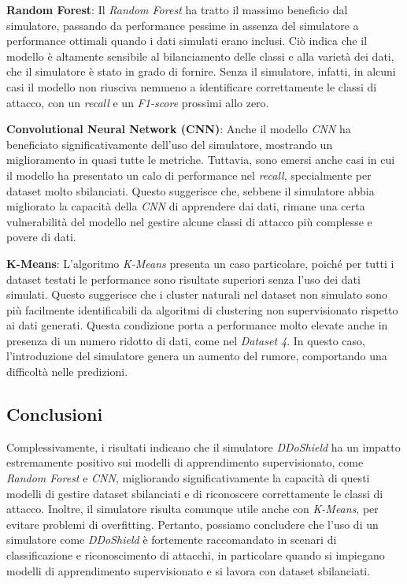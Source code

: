 \textbf{Random Forest}: Il \textit{Random Forest} ha tratto il massimo beneficio dal simulatore, passando da performance pessime in assenza del simulatore a performance ottimali quando i dati simulati erano inclusi. Ciò indica che il modello è altamente sensibile al bilanciamento delle classi e alla varietà dei dati, che il simulatore è stato in grado di fornire. Senza il simulatore, infatti, in alcuni casi il modello non riusciva nemmeno a identificare correttamente le classi di attacco, con un \textit{recall} e un \textit{F1-score} prossimi allo zero.

\textbf{Convolutional Neural Network (CNN)}: Anche il modello \textit{CNN} ha beneficiato significativamente dell'uso del simulatore, mostrando un miglioramento in quasi tutte le metriche. Tuttavia, sono emersi anche casi in cui il modello ha presentato un calo di performance nel \textit{recall}, specialmente per dataset molto sbilanciati. Questo suggerisce che, sebbene il simulatore abbia migliorato la capacità della \textit{CNN} di apprendere dai dati, rimane una certa vulnerabilità del modello nel gestire alcune classi di attacco più complesse e povere di dati.

\textbf{K-Means}: L'algoritmo \textit{K-Means} presenta un caso particolare, poiché per tutti i dataset testati le performance sono risultate superiori senza l'uso dei dati simulati. Questo suggerisce che i cluster naturali nel dataset non simulato sono più facilmente identificabili da algoritmi di clustering non supervisionato rispetto ai dati generati. Questa condizione porta a performance molto elevate anche in presenza di un numero ridotto di dati, come nel \textit{Dataset 4}. In questo caso, l'introduzione del simulatore genera un aumento del rumore, comportando una difficoltà nelle predizioni.

\subsection{Conclusioni}
Complessivamente, i risultati indicano che il simulatore \textit{DDoShield} ha un impatto estremamente positivo sui modelli di apprendimento supervisionato, come \textit{Random Forest} e \textit{CNN}, migliorando significativamente la capacità di questi modelli di gestire dataset sbilanciati e di riconoscere correttamente le classi di attacco. Inoltre, il simulatore risulta comunque utile anche con \textit{K-Means}, per evitare problemi di overfitting.
Pertanto, possiamo concludere che l'uso di un simulatore come \textit{DDoShield} è fortemente raccomandato in scenari di classificazione e riconoscimento di attacchi, in particolare quando si impiegano modelli di apprendimento supervisionato e si lavora con dataset sbilanciati. 

